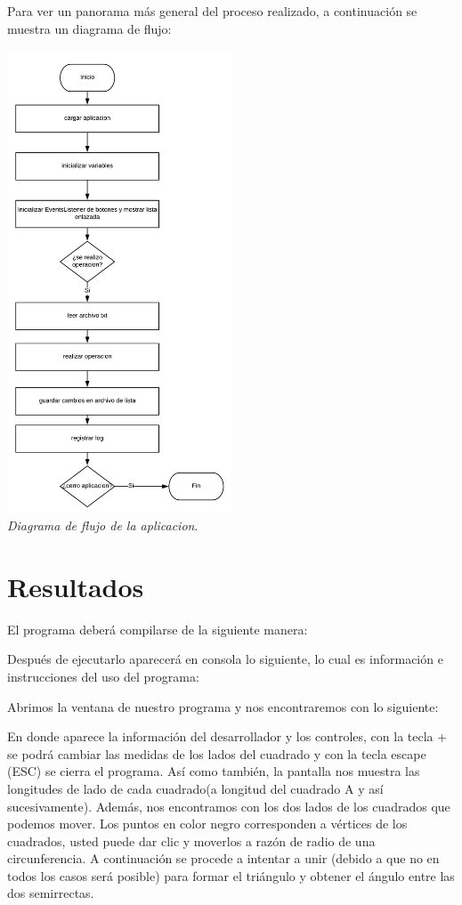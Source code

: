 \documentclass[conference]{IEEEtran}
\begin{document}
Para ver un panorama más general del proceso realizado, a continuación se muestra un diagrama de flujo:
\begin{center}
\includegraphics[width=0.5\textwidth]{flujo}
\\\textit{Diagrama de flujo de la aplicacion}.
\end{center}
\section{Resultados}
El programa deberá compilarse de la siguiente manera:



Después de ejecutarlo aparecerá en consola lo siguiente, lo cual es información e instrucciones del uso del programa:



Abrimos la ventana de nuestro programa y nos encontraremos con lo siguiente:

En donde aparece la información del desarrollador y los controles, con la tecla + se podrá cambiar las medidas de los lados del cuadrado y con la tecla escape (ESC) se cierra el programa. Así como también, la pantalla nos muestra las longitudes de lado de cada cuadrado(a longitud del cuadrado A y así sucesivamente). Además, nos encontramos con los dos lados de los cuadrados que podemos mover. Los puntos en color negro corresponden a vértices de los cuadrados, usted puede dar clic y moverlos a razón de radio de una circunferencia. A continuación se procede a intentar a unir (debido a que no en todos los casos será posible) para formar el triángulo y obtener el ángulo entre las dos semirrectas.
\end{document}
